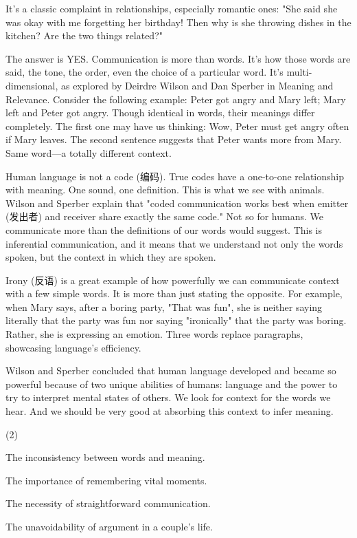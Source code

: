 \documentclass{英语试卷}
\begin{document}
\par It's a classic complaint in relationships, especially romantic ones: "She said she was okay with me forgetting her birthday! Then why is she throwing dishes in the kitchen? Are the two things related?"\par
\par The answer is YES. Communication is more than words. It's how those words are said, the tone, the order, even the choice of a particular word. It's multi-dimensional, as explored by Deirdre Wilson and Dan Sperber in Meaning and Relevance. Consider the following example: Peter got angry and Mary left; Mary left and Peter got angry. Though identical in words, their meanings differ completely. The first one may have us thinking: Wow, Peter must get angry often if Mary leaves. The second sentence suggests that Peter wants more from Mary. Same word—a totally different context.\par
\par Human language is not a code (编码). True codes have a one-to-one relationship with meaning. One sound, one definition. This is what we see with animals. Wilson and Sperber explain that "coded communication works best when emitter (发出者) and receiver share exactly the same code." Not so for humans. We communicate more than the definitions of our words would suggest. This is inferential communication, and it means that we understand not only the words spoken, but the context in which they are spoken.\par
\par Irony (反语) is a great example of how powerfully we can communicate context with a few simple words. It is more than just stating the opposite. For example, when Mary says, after a boring party, "That was fun", she is neither saying literally that the party was fun nor saying "ironically" that the party was boring. Rather, she is expressing an emotion. Three words replace paragraphs, showcasing language’s efficiency.\par
\par Wilson and Sperber concluded that human language developed and became so powerful because of two unique abilities of humans: language and the power to try to interpret mental states of others. We look for context for the words we hear. And we should be very good at absorbing this context to infer meaning.\par
{}
\begin{choices}(2)
  \item The inconsistency between words and meaning.
  \item The importance of remembering vital moments.
  \item The necessity of straightforward communication.
  \item The unavoidability of argument in a couple's life.
\end{choices}
\end{document}
